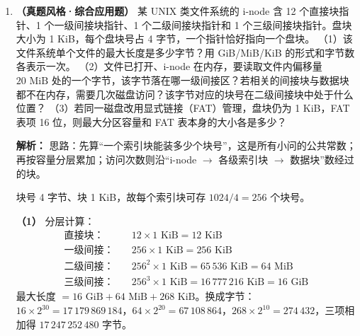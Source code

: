 \begin{enumerate}[start=7]
\ifshowsolutions\par\noindent\textbf{解析：} 思路：\texttt{0xFFFF0000} 是一个 32 位十六进制数，高 16 位（第 16～31 位）全为 0，低 16 位（第 0～15 位）全为 1。位号按“自低位向高位”递增，说明低号位先被检查，而低号位恰好全部已分配，所以第一个空闲位是 $j=16$。

字号 100 管理的盘块号范围是 $100\times 32=3200$ 到 $3231$，对应的位号 $j=0\sim 31$。代入 $b=i\times 32+j=100\times 32+16=3216$。

常见错误是把最高位当作位号 0，那样会算出 $j=0$ 从而选 3200；也有人把“第一个 0 位”误当作最后一个 1 位而选 3215，两者都不符合题设的编号约定。\else \answerarea \fi

\vspace{8pt}

\item \textbf{（真题风格·综合应用题）} 某 UNIX 类文件系统的 i-node 含 12 个直接块指针、1 个一级间接块指针、1 个二级间接块指针和 1 个三级间接块指针。盘块大小为 1 KiB，每个盘块号占 4 字节，一个指针恰好指向一个盘块。
（1）该文件系统单个文件的最大长度是多少字节？用 GiB/MiB/KiB 的形式和字节数各表示一次。
（2）文件已打开、i-node 在内存，要读取文件内偏移量 $20\text{ MiB}$ 处的一个字节，该字节落在哪一级间接区？若相关的间接块与数据块都不在内存，需要几次磁盘访问？该字节对应的块号在二级间接块中处于什么位置？
（3）若同一磁盘改用显式链接（FAT）管理，盘块仍为 1 KiB，FAT 表项 16 位，则最大分区容量和 FAT 表本身的大小各是多少？

\ifshowsolutions\par\noindent\textbf{解析：} 思路：先算“一个索引块能装多少个块号”，这是所有小问的公共常数；再按容量分层累加；访问次数则沿“i-node $\to$ 各级索引块 $\to$ 数据块”数经过的块。

块号 4 字节、块 1 KiB，故每个索引块可存 $1024/4=256$ 个块号。

\textbf{（1）} 分层计算：
\begin{align*}
\text{直接块：}\quad & 12\times 1\text{ KiB}=12\text{ KiB}\\
\text{一级间接：}\quad & 256\times 1\text{ KiB}=256\text{ KiB}\\
\text{二级间接：}\quad & 256^{2}\times 1\text{ KiB}=65\,536\text{ KiB}=64\text{ MiB}\\
\text{三级间接：}\quad & 256^{3}\times 1\text{ KiB}=16\,777\,216\text{ KiB}=16\text{ GiB}
\end{align*}
最大长度 $=16\text{ GiB}+64\text{ MiB}+268\text{ KiB}$。换成字节：$16\times 2^{30}=17\,179\,869\,184$，$64\times 2^{20}=67\,108\,864$，$268\times 2^{10}=274\,432$，三项相加得 $17\,247\,252\,480$ 字节。


\end{enumerate}
